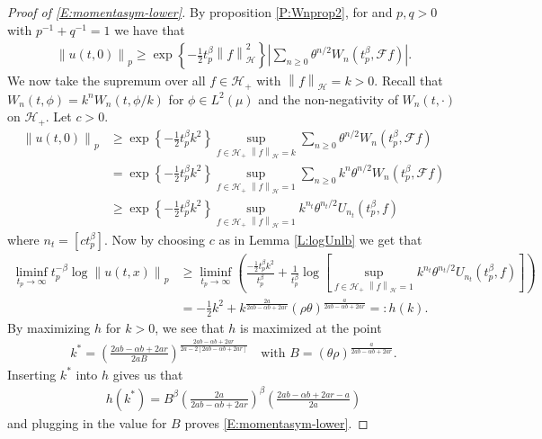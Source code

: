 \documentclass[12pt]{report}
\theoremstyle{plain}
\theoremstyle{definition}
\numberwithin{equation}{section}
\newcommand{\Norm}[1]{\left\|  #1   \right\|}
\begin{document}
\begin{proof}[Proof of \eqref{E:momentasym-lower}]
	By proposition \ref{P:Wnprop2}, for and $p,q >0$ with $p^{-1}+q^{-1} = 1$ we have that
	\begin{align*}
	\Norm{u(t,0)}_p \ge \exp\left\{ -\frac{1}{2} t_p^\beta \Norm{f}_{\mathcal{H}}^2 \right\}\left| \sum_{n \ge 0} \theta^{n/2} W_n(t_p^\beta, \mathcal{F}f) \right|.
	\end{align*}
	We now take the supremum over all $f \in \mathcal{H}_+$ with $\Norm{f}_{\mathcal{H}}=k >0 $.
	Recall that $W_n(t,\phi) = k^nW_n(t,\phi/k)$ for $\phi \in L^2(\mu)$ and the non-negativity of $W_n(t,\cdot)$ on $\mathcal{H}_+$. Let $c>0$.
	\begin{align*}
	\Norm{u(t,0)}_p
	& \ge   \exp\left\{ -\frac{1}{2} t_p^\beta k^2 \right\} \sup_{f\in \mathcal{H}_+ \; \Norm{f}_{\mathcal{H}}=k}\sum_{n \ge 0} \theta^{n/2} W_n(t_p^\beta, \mathcal{F}f) \\
	& = \exp\left\{ -\frac{1}{2} t_p^\beta k^2 \right\} \sup_{f\in \mathcal{H}_+ \; \Norm{f}_{\mathcal{H}}=1}\sum_{n \ge 0} k^n \theta^{n/2} W_n(t_p^\beta, \mathcal{F}f) \\
	& \ge \exp\left\{ -\frac{1}{2} t_p^\beta k^2 \right\} \sup_{f\in \mathcal{H}_+ \; \Norm{f}_{\mathcal{H}}=1} k^{n_t} \theta^{{n_t}/2} U_{n_t}(t_p^\beta, f)
	\end{align*}
	where $n_t = [ct_p^\beta]$. Now by choosing $c$ as in Lemma \ref{L:logUnlb} we get that
	\begin{align*}
	\liminf_{t_p \to \infty} t_p^{-\beta} \log \Norm{u(t,x)}_p
	& \ge   \liminf_{t_p \to \infty} \left( \frac{-\frac{1}{2}t_p^\beta k^2}{t_p^\beta} + \frac{1}{t_p^\beta}\log \left[ \sup_{f\in \mathcal{H}_+ \; \Norm{f}_{\mathcal{H}}=1} k^{n_t} \theta^{{n_t}/2} U_{n_t}(t_p^\beta, f) \right]  \right) \\
	& = -\frac{1}{2}k^2 + k^{ \frac{2a}{2ab-\alpha b +2ar} }(\rho \theta)^{\frac{a}{2ab -\alpha b + 2ar}} =: h(k).
	\end{align*}
	By maximizing $h$ for $k>0$, we see that $h$ is maximized at the point
	\begin{align*}
	k^* = \left( \frac{2ab -\alpha b + 2ar}{2aB} \right)^{ \frac{2ab-\alpha b +2ar}{2a-2[2ab-\alpha b + 2ar]}} \quad \text{with $B=(\theta\rho)^{ \frac{a}{2ab-\alpha b + 2ar} }$}.
	\end{align*}
	Inserting $k^*$ into $h$ gives us that
	\begin{align*}
	h(k^*) = B^{\beta}\left( \frac{2a}{2ab - \alpha b +2ar} \right)^\beta \left( \frac{2ab-\alpha b + 2ar -a }{2a} \right)
	\end{align*}
	and plugging in the value for $B$ proves \eqref{E:momentasym-lower}.
\end{proof}
\end{document}
